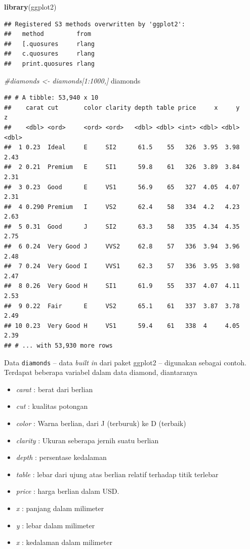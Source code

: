 \documentclass[]{book}
\newenvironment{Shaded}{\begin{snugshade}}{\end{snugshade}}
\newcommand{\KeywordTok}[1]{\textcolor[rgb]{0.13,0.29,0.53}{\textbf{#1}}}
\newcommand{\CommentTok}[1]{\textcolor[rgb]{0.56,0.35,0.01}{\textit{#1}}}
\newcommand{\NormalTok}[1]{#1}
\providecommand{\tightlist}{%
  \setlength{\itemsep}{0pt}\setlength{\parskip}{0pt}}
\begin{document}
\begin{Shaded}
\begin{Highlighting}[]
\KeywordTok{library}\NormalTok{(ggplot2)}
\end{Highlighting}
\end{Shaded}

\begin{verbatim}
## Registered S3 methods overwritten by 'ggplot2':
##   method         from 
##   [.quosures     rlang
##   c.quosures     rlang
##   print.quosures rlang
\end{verbatim}

\begin{Shaded}
\begin{Highlighting}[]
\CommentTok{#diamonds <- diamonds[1:1000,]}
\NormalTok{diamonds}
\end{Highlighting}
\end{Shaded}

\begin{verbatim}
## # A tibble: 53,940 x 10
##    carat cut       color clarity depth table price     x     y     z
##    <dbl> <ord>     <ord> <ord>   <dbl> <dbl> <int> <dbl> <dbl> <dbl>
##  1 0.23  Ideal     E     SI2      61.5    55   326  3.95  3.98  2.43
##  2 0.21  Premium   E     SI1      59.8    61   326  3.89  3.84  2.31
##  3 0.23  Good      E     VS1      56.9    65   327  4.05  4.07  2.31
##  4 0.290 Premium   I     VS2      62.4    58   334  4.2   4.23  2.63
##  5 0.31  Good      J     SI2      63.3    58   335  4.34  4.35  2.75
##  6 0.24  Very Good J     VVS2     62.8    57   336  3.94  3.96  2.48
##  7 0.24  Very Good I     VVS1     62.3    57   336  3.95  3.98  2.47
##  8 0.26  Very Good H     SI1      61.9    55   337  4.07  4.11  2.53
##  9 0.22  Fair      E     VS2      65.1    61   337  3.87  3.78  2.49
## 10 0.23  Very Good H     VS1      59.4    61   338  4     4.05  2.39
## # ... with 53,930 more rows
\end{verbatim}

Data \texttt{diamonds} -- data \emph{built in} dari paket ggplot2 --
digunakan sebagai contoh. Terdapat beberapa variabel dalam data diamond,
diantaranya

\begin{itemize}
\tightlist
\item
  \emph{carat} : berat dari berlian
\item
  \emph{cut} : kualitas potongan
\item
  \emph{color} : Warna berlian, dari J (terburuk) ke D (terbaik)
\item
  \emph{clarity} : Ukuran seberapa jernih suatu berlian
\item
  \emph{depth} : persentase kedalaman
\item
  \emph{table} : lebar dari ujung atas berlian relatif terhadap titik
  terlebar
\item
  \emph{price} : harga berlian dalam USD.
\item
  \emph{x} : panjang dalam milimeter
\item
  \emph{y} : lebar dalam milimeter
\item
  \emph{x} : kedalaman dalam milimeter
\end{itemize}
\end{document}
